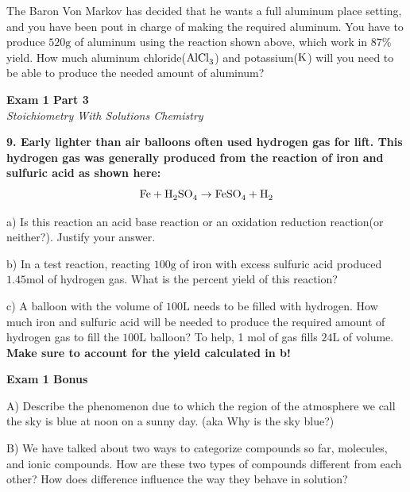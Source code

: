 \documentclass{article}
\begin{document}
    The Baron Von Markov has decided that he wants a full aluminum place setting, and you have been pout in charge of making the required aluminum. You have to produce $520 \si{\gram}$ of aluminum using the reaction shown above, which work in $87\%$ yield. How much aluminum chloride($\ce{AlCl_{3}}$) and potassium($\ce{K}$) will you need to be able to produce the needed amount of aluminum?

    \pagebreak

    \begin{center}
        \textbf{Exam 1 Part 3}\\
        \textit{Stoichiometry With Solutions Chemistry}
    \end{center}
    \textbf{9. Early lighter than air balloons often used hydrogen gas for lift. This hydrogen gas was generally produced from the reaction of iron and sulfuric acid as shown here:}
    $$\ce{Fe} + \ce{H_{2}SO_{4}} \rightarrow \ce{FeSO_{4}} + \ce{H_{2}}$$

    a) Is this reaction an acid base reaction or an oxidation reduction reaction(or neither?). Justify your answer.

    b) In a test reaction, reacting $100 \si{\gram}$ of iron with excess sulfuric acid produced $1.45 \si{\mole}$ of hydrogen gas. What is the percent yield of this reaction?

    c) A balloon with the volume of $100 \si{\liter}$ needs to be filled with hydrogen. How much iron and sulfuric acid will be needed to produce the required amount of hydrogen gas to fill the $100 \si{\liter}$ balloon? To help, 1 $\si{\mole}$ of gas fills $24 \si{\liter}$ of volume. \textbf{Make sure to account for the yield calculated in b!}

    \pagebreak

    \begin{center}
        \textbf{Exam 1 Bonus}\\
    \end{center}

    A) Describe the phenomenon due to which the region of the atmosphere we call the sky is blue at noon on a sunny day. (aka Why is the sky blue?)

    B) We have talked about two ways to categorize compounds so far, molecules, and ionic compounds. How are these two types of compounds different from each other? How does difference influence the way they behave in solution?
    \pagebreak
\end{document}
